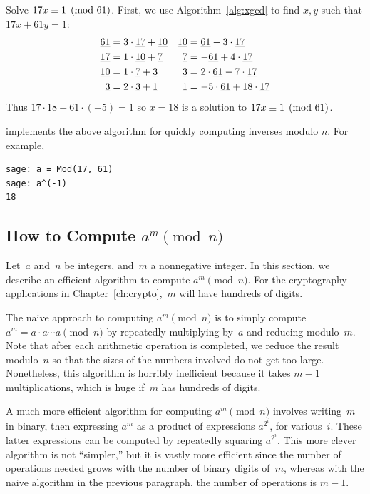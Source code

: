 \begin{example}
Solve $17x \equiv 1\pmod{61}$.
First, we use Algorithm~\ref{alg:xgcd} to find $x, y$ such that
$17x+61y=1$:
\begin{align*}
\underline{61}&=3\cdot\underline{17}+\underline{10} & \underline{10} &=\underline{61} - 3\cdot\underline{17}\\
\underline{17}&=1\cdot\underline{10}+\underline{7}  & \underline{7}  &=-\underline{61} + 4\cdot\underline{17}\\
\underline{10}&=1\cdot \underline{7}+\underline{3}  & \underline{3}  &=2\cdot\underline{61} - 7\cdot\underline{17}\\
\underline{3} &=2\cdot\underline{3} +\underline{1}  & \underline{1}  &=-5\cdot\underline{61}+18\cdot\underline{17}
\end{align*}
Thus $17\cdot 18 + 61\cdot (-5) = 1$ so $x=18$
is a solution to $17x \equiv 1\pmod{61}$.
\end{example}

\begin{sg}
\sage implements the above algorithm for quickly
computing inverses modulo $n$. For example,
\begin{verbatim}
sage: a = Mod(17, 61)
sage: a^(-1)
18
\end{verbatim}
\end{sg}

\subsection{How to Compute $a^m\pmod{n}$}
\label{sec:compute_powers}
Let~$a$ and~$n$ be integers, and~$m$ a nonnegative integer.
In this section, we describe an efficient algorithm to compute
$a^m\pmod{n}$.  For the cryptography
applications in Chapter~\ref{ch:crypto},~$m$ will have
hundreds of digits.

The naive approach to computing $a^m\pmod{n}$ is to simply compute
$a^m = a\cdot a \cdots a\pmod{n}$ by repeatedly multiplying by~$a$ and
reducing modulo~$m$. Note that after each arithmetic operation is
completed, we reduce the result modulo~$n$ so that the sizes of the
numbers involved do not get too large.  Nonetheless, this algorithm is
horribly inefficient because it takes $m-1$ multiplications, which
is huge if~$m$ has hundreds of digits.

A much more efficient algorithm for computing $a^m\pmod{n}$ involves
writing~$m$ in binary, then expressing $a^m$ as a product of
expressions $a^{2^i}$, for various~$i$.  These latter expressions can
be computed by repeatedly squaring $a^{2^i}$.  This more clever
algorithm is not ``simpler,'' but it is vastly more efficient since
the number of operations needed grows with the number of binary digits
of~$m$, whereas with the naive algorithm in the previous paragraph, the
number of operations is $m-1$.

